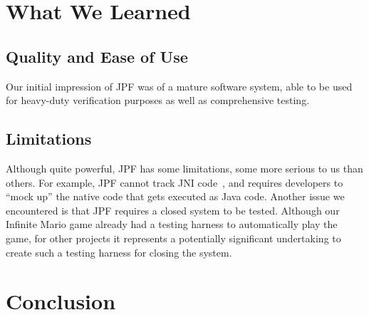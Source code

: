 \documentclass[twocolumn]{article}
\begin{document}
\section{What We Learned}

\subsection{Quality and Ease of Use}
Our initial impression of JPF was of a mature software system, able to be used for heavy-duty verification purposes as well as comprehensive testing. 


\subsection{Limitations}
Although quite powerful, JPF has some limitations, some more serious to us than others. 
For example, JPF cannot track JNI code~\cite{jni}, and requires developers to ``mock up'' the native code that gets executed as Java code. 
Another issue we encountered is that JPF requires a closed system to be tested. 
Although our Infinite Mario game already had a testing harness to automatically play the game, for other projects it represents a potentially significant undertaking to create such a testing harness for closing the system. 

\section{Conclusion}





\end{document}
